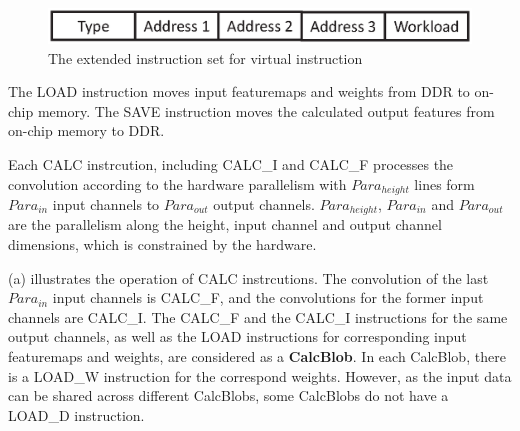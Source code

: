 \begin{figure}[h]
	\centering
	\includegraphics[width=0.9\linewidth]{fig/normal_instr.eps}
	\caption{The extended instruction set for virtual instruction }
	\label{fig:normal_instr}
\end{figure}

The LOAD instruction moves input featuremaps and weights from DDR to on-chip memory. The SAVE instruction moves the calculated output features from on-chip memory to DDR. 

 Each CALC  instrcution,  including CALC\_I and CALC\_F processes the convolution according to the hardware parallelism with $Para_{height}$ lines form $ Para_{in} $ input channels to $ Para_{out}$ output channels. $Para_{height}$, $ Para_{in} $ and $ Para_{out} $ are the parallelism along the height, input channel and output channel dimensions, which is constrained by the hardware.

 (a) illustrates the operation of CALC instrcutions. The convolution of the last $ Para_{in} $ input channels is CALC\_F, and the convolutions for the former input channels are CALC\_I. The CALC\_F and the CALC\_I instructions for the same output channels, as well as the LOAD instructions for corresponding input featuremaps and weights, are considered as a \textbf{CalcBlob}. In each CalcBlob, there is a LOAD\_W instruction for the correspond weights. However, as the input data can be shared across different CalcBlobs, some CalcBlobs do not have a LOAD\_D instruction. 


